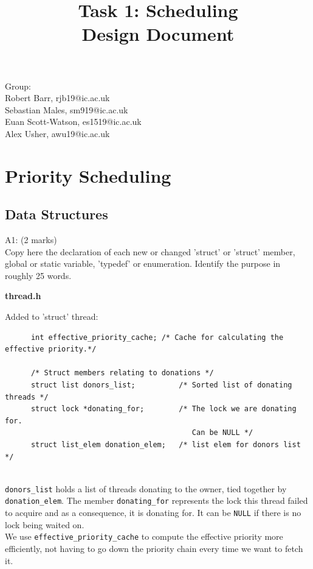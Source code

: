 \documentclass[11pt, a4paper]{article}
\begin{document}
\title{Task 1: Scheduling\\Design Document}
\author{}
\date{}
\maketitle


\begin{center}
Group:\\
Robert Barr, rjb19@ic.ac.uk\\
Sebastian Males, sm919@ic.ac.uk\\
Euan Scott-Watson, es1519@ic.ac.uk\\
Alex Usher, awu19@ic.ac.uk
\end{center}

\section{Priority Scheduling}
	\subsection{Data Structures}
		A1: (2 marks)\\
		Copy here the declaration of each new or changed 'struct' or 'struct' member, global or static
		variable, 'typedef' or enumeration. Identify the purpose in roughly 25 words.
		
		\begin{center}\textbf{thread.h}\end{center}
		Added to 'struct' thread:
		
		\begin{verbatim}
      int effective_priority_cache; /* Cache for calculating the effective priority.*/
        
      /* Struct members relating to donations */
      struct list donors_list;          /* Sorted list of donating threads */
      struct lock *donating_for;        /* The lock we are donating for.      
                                           Can be NULL */
      struct list_elem donation_elem;   /* list elem for donors list */
        
		\end{verbatim}
		\verb+donors_list+ holds a list of threads donating
		to the owner, tied together by \verb+donation_elem+. The member \verb+donating_for+
		represents the lock this thread failed to acquire and as a consequence, it is donating for. It can 
		be \verb+NULL+ if there is no lock being waited
		on.\\
		We use \verb+effective_priority_cache+ to compute
		the effective priority more efficiently, not having to go down the priority chain every time we want
		to fetch it.
\end{document}
